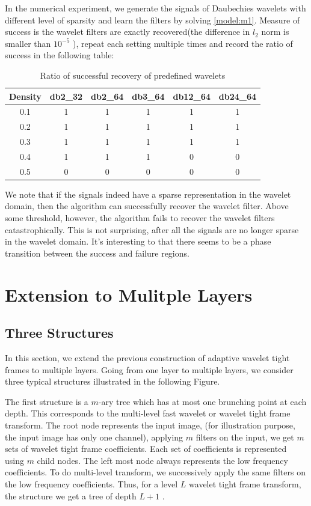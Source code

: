 \documentclass[a4paper]{article}
\begin{document}
In the numerical experiment, we generate the signals of Daubechies wavelets with different level of sparsity and learn the filters by solving \eqref{model:m1}. Measure of success is the wavelet filters are exactly recovered(the difference in $l_2$ norm is smaller than $10^{-5}$ ), repeat each setting multiple times and record the ratio of success in the following table:
\begin{table}

\centering
\begin{tabular}{| c | c | c | c| c | c |}

\hline
Density & db2\_32 & db2\_64 & db3\_64 & db12\_64 & db24\_64 \\
\hline
0.1 & 1 & 1 & 1 & 1 & 1 \\
\hline
0.2 & 1 & 1& 1 & 1 & 1 \\
\hline 
0.3 & 1 & 1 & 1 & 1 & 1  \\
\hline
0.4 & 1 & 1 & 1 & 0 & 0  \\
\hline 
0.5 & 0 & 0 & 0 & 0 & 0 \\
\hline

\end{tabular}
\caption{Ratio of successful recovery of predefined wavelets}
\end{table}
We note that if the signals indeed have a sparse representation in the wavelet domain, then the algorithm can successfully recover the wavelet filter. Above some threshold, however, the algorithm fails to recover the wavelet filters catastrophically. This is not surprising, after all the signals are no longer sparse in the wavelet domain. It's interesting to that there seems to be a phase transition between the success and failure regions.


\section{Extension to Mulitple Layers}
\subsection{Three Structures}
In this section, we extend the previous construction of adaptive wavelet tight frames to multiple layers. Going from one layer to multiple layers, we consider three typical structures illustrated in the following Figure.
\begin{figure}[h!]

\label{fig:arch}
\end{figure}


The first structure is a $m$-ary tree which has at most one brunching point at each depth. This corresponds to the multi-level fast wavelet or wavelet tight frame transform. The root node represents the input image, (for illustration purpose, the input image has only one channel), applying $m$ filters on the input, we get $m$ sets of wavelet tight frame coefficients. Each set of coefficients is represented using $m$ child nodes. The left most node always represents the low frequency coefficients. To do multi-level transform, we successively apply the same filters on the low frequency coefficients. Thus, for a level $L$ wavelet tight frame transform, the structure we get a tree of depth $L+1$ . 
\end{document}
